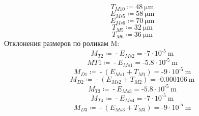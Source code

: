 \documentclass{article}
\newcommand{\defeq}{\coloneq} %
\begin{document}
\begin{equation*}
\textit{T}_{\textit{M10}} \defeq 48 \: \mathrm{μm}
\end{equation*}
\begin{equation*}
\textit{E}_{\textit{Ms5}} \defeq 58 \: \mathrm{μm}
\end{equation*}
\begin{equation*}
\textit{E}_{\textit{Ms6}} \defeq 70 \: \mathrm{μm}
\end{equation*}
\begin{equation*}
\textit{T}_{\textit{M5}} \defeq 32 \: \mathrm{μm}
\end{equation*}
\begin{equation*}
\textit{T}_{\textit{M6}} \defeq 36 \: \mathrm{μm}
\end{equation*}
\colorbox[HTML]{000000}{Отклонения размеров по роликам M:}\newline
\begin{equation*}
\textit{M}_{\textit{T2}} \defeq  \operatorname{-} \textit{E}_{\textit{Ms2}} = { \operatorname{-} 7 \cdot 10^{ \operatorname{-} 5} \: \mathrm{m}}
\end{equation*}
\begin{equation*}
\textit{MT1} \defeq  \operatorname{-} \textit{E}_{\textit{Ms1}} = { \operatorname{-} 5.8 \cdot 10^{ \operatorname{-} 5} \: \mathrm{m}}
\end{equation*}
\begin{equation*}
\textit{M}_{\textit{D1}} \defeq  \operatorname{-} \left( \textit{E}_{\textit{Ms1}}+\textit{T}_{\textit{M1}} \right) = { \operatorname{-} 9 \cdot 10^{ \operatorname{-} 5} \: \mathrm{m}}
\end{equation*}
\begin{equation*}
\textit{M}_{\textit{D2}} \defeq  \operatorname{-} \left( \textit{E}_{\textit{Ms2}}+\textit{T}_{\textit{M2}} \right) = { \operatorname{-} 0.000106 \: \mathrm{m}}
\end{equation*}
\begin{equation*}
\textit{M}_{\textit{T3}} \defeq  \operatorname{-} \textit{E}_{\textit{Ms3}} = { \operatorname{-} 5.8 \cdot 10^{ \operatorname{-} 5} \: \mathrm{m}}
\end{equation*}
\begin{equation*}
\textit{M}_{\textit{T4}} \defeq  \operatorname{-} \textit{E}_{\textit{Ms4}} = { \operatorname{-} 7 \cdot 10^{ \operatorname{-} 5} \: \mathrm{m}}
\end{equation*}
\begin{equation*}
\textit{M}_{\textit{D3}} \defeq  \operatorname{-} \left( \textit{E}_{\textit{Ms3}}+\textit{T}_{\textit{M3}} \right) = { \operatorname{-} 9 \cdot 10^{ \operatorname{-} 5} \: \mathrm{m}}
\end{equation*}
\end{document}

